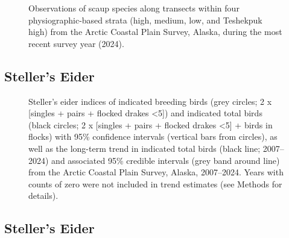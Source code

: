 \documentclass[
]{article}
\begin{document}
\begin{figure}


\caption{\label{fig-UNSCmap}Observations of scaup species along
transects within four physiographic-based strata (high, medium, low, and
Teshekpuk high) from the Arctic Coastal Plain Survey, Alaska, during the
most recent survey year (2024).}

\end{figure}%

\newpage{}

\subsection*{Steller's Eider}\label{stellers-eider}

\begin{figure}


\caption{\label{fig-STEI}Steller's eider indices of indicated breeding
birds (grey circles; 2 x {[}singles + pairs + flocked drakes
\textless5{]}) and indicated total birds (black circles; 2 x {[}singles
+ pairs + flocked drakes \textless5{]} + birds in flocks) with 95\%
confidence intervals (vertical bars from circles), as well as the
long-term trend in indicated total birds (black line; 2007--2024) and
associated 95\% credible intervals (grey band around line) from the
Arctic Coastal Plain Survey, Alaska, 2007--2024. Years with counts of
zero were not included in trend estimates (see Methods for details).}

\end{figure}%

\newpage{}

\subsection*{Steller's Eider}\label{stellers-eider-1}

\begingroup\fontsize{10}{12}\selectfont
\end{document}
